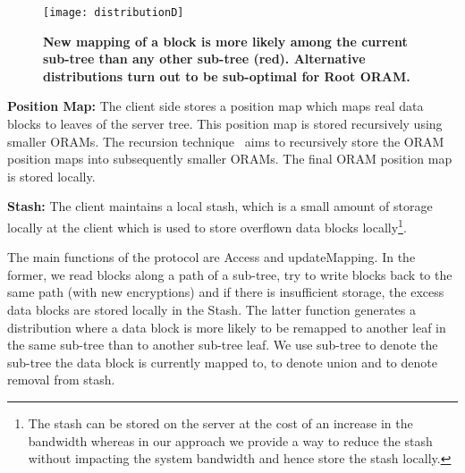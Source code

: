 \documentclass[USenglish,oneside,twocolumn]{article}
\makeatletter
\newcommand{\ourprotocol}{Root ORAM}
\let\origsubsection\subsection
\renewcommand\subsection{\@ifstar{\starsubsection}{\nostarsubsection}}
\newcommand\nostarsubsection[1]
{\subsectionprelude\origsubsection{#1}\subsectionpostlude}
\newcommand\starsubsection[1]
{\subsectionprelude\origsubsection*{#1}\subsectionpostlude}
\newcommand\subsectionprelude{\vspace{-1.5em}}
\newcommand\subsectionpostlude{\vspace{-1em}}
\makeatother
\begin{document}
\begin{figure}
\centering
\texttt{[image: distributionD]}
\vspace{-5pt}
\caption{\textbf{New mapping of a block is more likely among the current sub-tree than any other sub-tree (red). Alternative distributions turn out to be sub-optimal for \ourprotocol{}.}}
\label{fig:distributionD}
\end{figure}


\subsection{Client Storage}
\textbf{Position Map: }The client side stores a position map which maps real data blocks to leaves of the server tree. This position map is stored recursively using smaller ORAMs. The recursion technique~\cite{tree_based_orams, SSSoram, pathoram} aims to recursively store the ORAM position maps into subsequently smaller ORAMs. The final ORAM position map is stored locally.


\textbf{Stash: }The client maintains a local stash, which is a small amount of storage locally at the client which is used to store overflown data blocks locally\footnote{The stash can be stored on the server at the cost of an increase in the bandwidth whereas in our approach we provide a way to reduce the stash without impacting the system bandwidth and hence store the stash locally.}.\vspace{5mm}


\subsection{Protocol Details}
The main functions of the protocol are Access and updateMapping. 
In the former, we read blocks along a path of a sub-tree, try to write blocks back to the same path (with new encryptions) and if there is insufficient storage, the excess data blocks are stored locally in the Stash. The latter function generates a distribution where a data block is more likely to be remapped to another leaf in the same sub-tree than to another sub-tree leaf. We use sub-tree to denote the sub-tree the data block  is currently mapped to,  to denote union and  to denote removal from stash.

\vspace{2mm}
\noindent{}\vspace{2mm}
\end{document}
